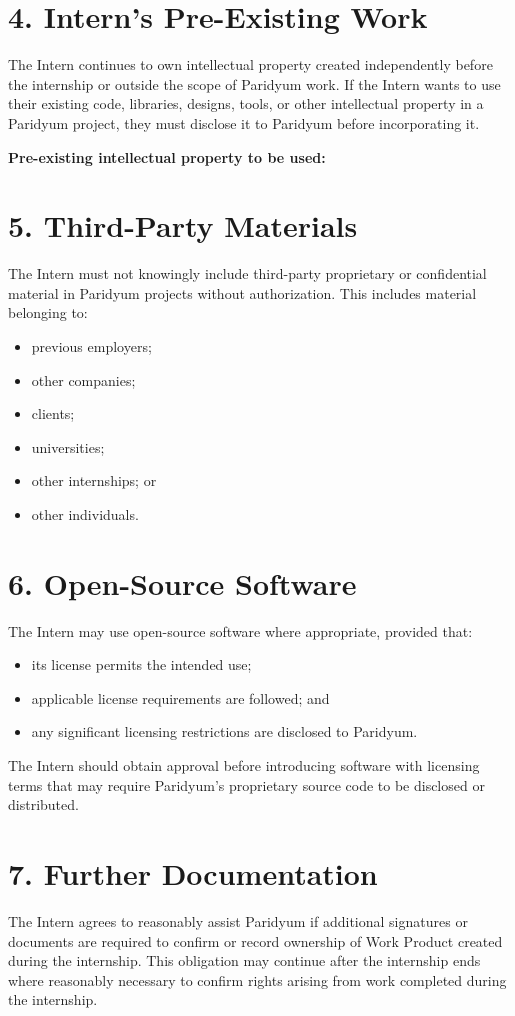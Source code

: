 \documentclass{paridyum}
\begin{document}
\section*{4. Intern's Pre-Existing Work}
The Intern continues to own intellectual property created independently before the
internship or outside the scope of Paridyum work. If the Intern wants to use their
existing code, libraries, designs, tools, or other intellectual property in a Paridyum
project, they must disclose it to Paridyum before incorporating it.

\vspace{0.4em}
\textbf{Pre-existing intellectual property to be used:} \dkPPreExistingIp

\section*{5. Third-Party Materials}
The Intern must not knowingly include third-party proprietary or confidential material
in Paridyum projects without authorization. This includes material belonging to:
\begin{itemize}[leftmargin=*, noitemsep]
    \item previous employers;
    \item other companies;
    \item clients;
    \item universities;
    \item other internships; or
    \item other individuals.
\end{itemize}

\section*{6. Open-Source Software}
The Intern may use open-source software where appropriate, provided that:
\begin{itemize}[leftmargin=*, noitemsep]
    \item its license permits the intended use;
    \item applicable license requirements are followed; and
    \item any significant licensing restrictions are disclosed to Paridyum.
\end{itemize}
The Intern should obtain approval before introducing software with licensing terms
that may require Paridyum's proprietary source code to be disclosed or distributed.

\section*{7. Further Documentation}
The Intern agrees to reasonably assist Paridyum if additional signatures or documents
are required to confirm or record ownership of Work Product created during the
internship. This obligation may continue after the internship ends where reasonably
necessary to confirm rights arising from work completed during the internship.
\end{document}
